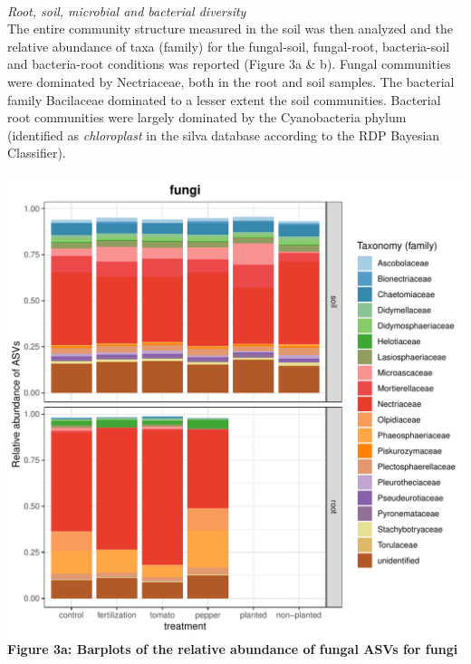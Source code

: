 \documentclass[11pt,]{article}
\begin{document}
~\\
\emph{Root, soil, microbial and bacterial diversity}\\
The entire community structure measured in the soil was then analyzed
and the relative abundance of taxa (family) for the fungal-soil,
fungal-root, bacteria-soil and bacteria-root conditions was reported
(Figure 3a \& b). Fungal communities were dominated by Nectriaceae, both
in the root and soil samples. The bacterial family Bacilaceae dominated
to a lesser extent the soil communities. Bacterial root communities were
largely dominated by the Cyanobacteria phylum (identified as
\emph{chloroplast} in the silva database according to the RDP Bayesian
Classifier).\\
\hspace*{0.333em}\\
\includegraphics[width=7.29167in]{../figures/Figure4_FAMILY_barplots_fungi.pdf}\\
\textbf{Figure 3a: Barplots of the relative abundance of fungal ASVs for
fungi}\\
\hspace*{0.333em} ~\\
\end{document}
